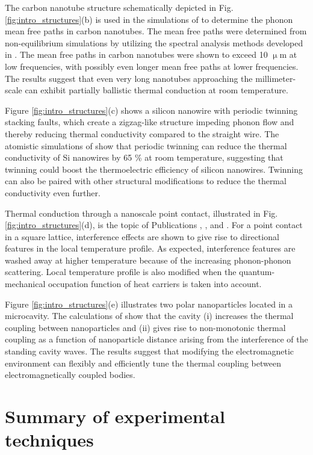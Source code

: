 The carbon nanotube structure schematically depicted in Fig. \ref{fig:intro_structures}(b) is used in the simulations of  to determine the phonon mean free paths in carbon nanotubes. The mean free paths were determined from non-equilibrium simulations by utilizing the spectral analysis methods developed in . The mean free paths in carbon nanotubes were shown to exceed 10 $\upmu$m at low frequencies, with possibly even longer mean free paths at lower frequencies. The results suggest that even very long nanotubes approaching the millimeter-scale can exhibit partially ballistic thermal conduction at room temperature. 

Figure \ref{fig:intro_structures}(c) shows a silicon nanowire with periodic twinning stacking faults, which create a zigzag-like structure impeding phonon flow and thereby reducing thermal conductivity compared to the straight wire. The atomistic simulations of  show that periodic twinning can reduce the thermal conductivity of Si nanowires by 65 \% at room temperature, suggesting that twinning could boost the thermoelectric efficiency of silicon nanowires. Twinning can also be paired with other structural modifications to reduce the thermal conductivity even further.

Thermal conduction through a nanoscale point contact, illustrated in Fig. \ref{fig:intro_structures}(d), is the topic of Publications , , and . For a point contact in a square lattice, interference effects are shown to give rise to directional features in the local temperature profile. As expected, interference features are washed away at higher temperature because of the increasing phonon-phonon scattering. Local temperature profile is also modified when the quantum-mechanical occupation function of heat carriers is taken into account. 

Figure \ref{fig:intro_structures}(e) illustrates two polar nanoparticles located in a microcavity. The calculations of  show that the cavity (i) increases the thermal coupling between nanoparticles and (ii) gives rise to non-monotonic thermal coupling as a function of nanoparticle distance arising from the interference of the standing cavity waves. The results suggest that modifying the electromagnetic environment can flexibly and efficiently tune the thermal coupling between electromagnetically coupled bodies.



\iffalse
\section{Summary of experimental techniques}


